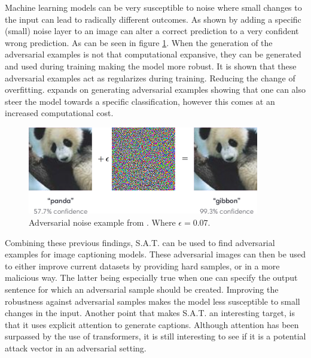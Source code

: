 Machine learning models can be very susceptible to noise where small changes to the input can lead to radically different outcomes. As shown by \citeauthor{goodfellow2015explaining} adding a specific (small) noise layer to an image can alter a correct prediction to a very confident wrong prediction. As can be seen in figure \ref{adv_gibbon}. When the generation of the adversarial examples is not that computational expansive, they can be generated and used during training making the model more robust. It is shown that these adversarial examples act as regularizes during training. Reducing the change of overfitting. \citeauthor{Kurakin} expands on generating adversarial examples showing that one can also steer the model towards a specific classification, however this comes at an increased computational cost.

\begin{figure}[h]
    \centering
    \includegraphics[width=0.9\textwidth]{figures/adversarial_img_1.png}
    \caption{Adversarial noise example from \protect\cite{goodfellow2015explaining}. Where $\epsilon=0.07$.}
    \label{adv_gibbon}
\end{figure}

Combining these previous findings, S.A.T. can be used to find adversarial examples for image captioning models. These adversarial images can then be used to either improve current datasets by providing hard samples, or in a more malicious way. The latter being especially true when one can specify the output sentence for which an adversarial sample should be created. Improving the robustness against adversarial samples makes the model less susceptible to small changes in the input. Another point that makes S.A.T. an interesting target, is that it uses explicit attention to generate captions. Although attention has been surpassed by the use of transformers, it is still interesting to see if it is a potential attack vector in an adversarial setting.

